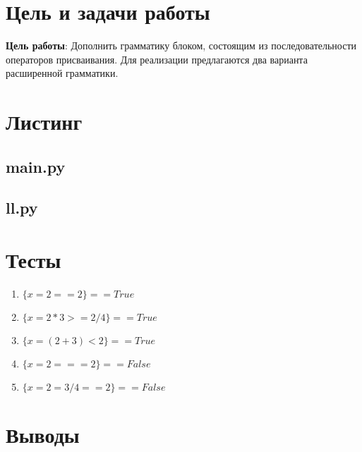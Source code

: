 \newpage
	\section{Цель и задачи работы}
		\textbf{Цель работы}: Дополнить грамматику блоком, состоящим из последовательности операторов присваивания. 
			Для реализации предлагаются два варианта расширенной грамматики.


	\section{Листинг}
        
        
        \subsection{main.py}
        

        \subsection{ll.py}
        



	\section{Тесты}
		\begin{enumerate}
			\item $\{x=2==2\} == True$ \\
			\item $\{x=2*3>=2/4\} == True$ \\
			\item $\{x=(2+3)<2\} == True$ \\
			\item $\{x=2===2\} == False$ \\
			\item $\{x=2=3/4==2\} == False$
		\end{enumerate}


	\newpage
	\section{Выводы}
	
